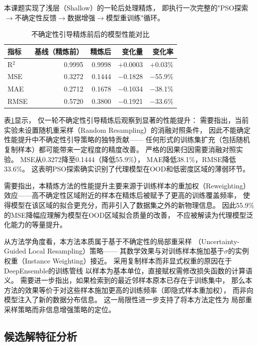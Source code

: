 本课题实现了浅层（Shallow）的一轮后处理精炼，
即执行一次完整的"PSO探索$\to$不确定性反馈$\to$数据增强$\to$模型重训练"循环。

\begin{table}[H]
\centering
\caption{不确定性引导精炼前后的模型性能对比}
\begin{tabular}{lrrrr}
\toprule
指标 & 基线（精炼前） & 精炼后 & 变化量 & 变化率 \\
\midrule
R$^2$ & 0.9995 & 0.9998 & +0.0003 & +0.03\% \\
MSE & 0.3272 & 0.1444 & $-$0.1828 & $-$55.9\% \\
MAE & 0.2712 & 0.1678 & $-$0.1034 & $-$38.1\% \\
RMSE & 0.5720 & 0.3800 & $-$0.1921 & $-$33.6\% \\
\bottomrule
\end{tabular}
\label{tab:al_metrics}
\end{table}

表\ref{tab:al_metrics}显示，
仅一轮不确定性引导精炼后观察到显著的性能提升：
需要指出，当前实验未设置随机重采样（Random Resampling）的消融对照条件，
因此不能确定性能提升中不确定性引导策略的独特贡献——
任何形式的训练集扩充（包括随机复制样本）都可能带来一定程度的精度改善。
严格的因果归因需要消融对照实验。
MSE从0.3272降至0.1444（降低55.9\%），
MAE降低38.1\%，RMSE降低33.6\%。
这表明PSO探索确实识别了代理模型在OOD和低密度区域的薄弱环节。

需要指出，本精炼方法的性能提升主要来源于训练样本的重加权（Reweighting）
效应——高不确定性区域附近的样本在精炼后被赋予了更高的训练覆盖频率，
使得模型在该区域的拟合更充分，而非引入了数据集之外的新物理信息。
因此55.9\%的MSE降幅应理解为模型在OOD区域拟合质量的改善，
不应被解读为代理模型泛化能力的等量提升。

从方法学角度看，本方法本质属于基于不确定性的局部重采样
（Uncertainty-Guided Local Resampling）策略——
其数学效果与对训练样本施加基于$\sigma$的实例权重（Instance Weighting）接近。
采用复制样本而非显式权重的原因在于DeepEnsemble的训练管线
以样本为基本单位，直接赋权需修改损失函数的计算语义。
需要进一步指出，如果检索到的最近邻样本原本已存在于训练集中，
那么本方法的效果等价于对这些样本施加更高的训练频率（即隐式样本重加权），
而非向模型注入了新的数据分布信息。
这一局限性进一步支持了将本方法定性为
局部重采样策略而非信息增强策略的定位。

\subsection{候选解特征分析}

